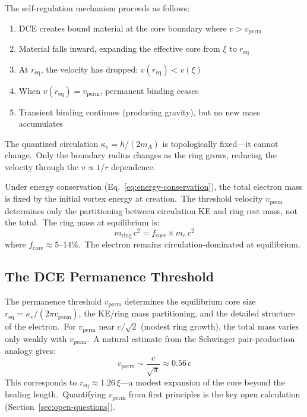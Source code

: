 \documentclass[12pt,letterpaper]{article}
\begin{document}
The self-regulation mechanism proceeds as follows:

\begin{enumerate}[leftmargin=2em]
  \item DCE creates bound material at the core boundary where
    $v > v_{\mathrm{perm}}$
  \item Material falls inward, expanding the effective core from $\xi$ to
    $r_{\mathrm{eq}}$
  \item At $r_{\mathrm{eq}}$, the velocity has dropped:
    $v(r_{\mathrm{eq}}) < v(\xi)$
  \item When $v(r_{\mathrm{eq}}) = v_{\mathrm{perm}}$, permanent binding
    ceases
  \item Transient binding continues (producing gravity), but no new mass
    accumulates
\end{enumerate}

The quantized circulation $\kappa_e = h/(2m_A)$ is topologically fixed---it
cannot change.\ Only the boundary radius changes as the ring grows, reducing
the velocity through the $v \propto 1/r$ dependence.

Under energy conservation (Eq.~\ref{eq:energy-conservation}), the total
electron mass is fixed by the initial vortex energy at creation.\ The
threshold velocity $v_{\mathrm{perm}}$ determines only the partitioning
between circulation KE and ring rest mass, not the total.\ The ring mass at
equilibrium is:
%
\begin{equation}
  m_{\mathrm{ring}}\,c^2 = f_{\mathrm{core}} \times m_e\,c^2
  \label{eq:mring}
\end{equation}
%
where $f_{\mathrm{core}} \approx 5$--$14\%$.\ The electron remains
circulation-dominated at equilibrium.

\subsection{The DCE Permanence Threshold}
\label{sec:threshold}

The permanence threshold $v_{\mathrm{perm}}$ determines the equilibrium core
size $r_{\mathrm{eq}} = \kappa_e/(2\pi v_{\mathrm{perm}})$, the KE/ring
mass partitioning, and the detailed structure of the electron.\ For
$v_{\mathrm{perm}}$ near $c/\sqrt{2}$ (modest ring growth), the total mass
varies only weakly with $v_{\mathrm{perm}}$.\ A natural estimate from the
Schwinger pair-production analogy gives:
%
\begin{equation}
  v_{\mathrm{perm}} \sim \frac{c}{\sqrt{\pi}} \approx 0.56\,c
  \label{eq:threshold-estimate}
\end{equation}
%
This corresponds to $r_{\mathrm{eq}} \approx 1.26\,\xi$---a modest expansion
of the core beyond the healing length.\ Quantifying $v_{\mathrm{perm}}$ from
first principles is the key open calculation
(Section~\ref{sec:open-questions}).
\end{document}
